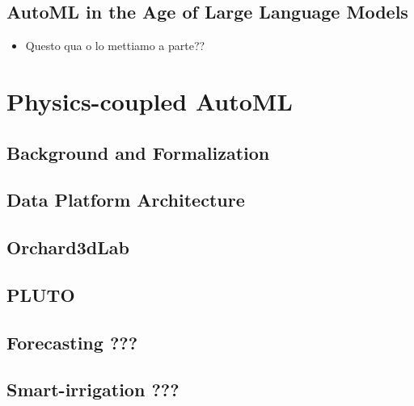 \documentclass[a4paper,12pt,times,numbered,print,index]{Classes/PhDThesisPSnPDF}
\begin{document}
\chapter{AutoML in the Age of Large Language Models}
\label{automl-chap:llm}
\begin{itemize}
    \item Questo qua o lo mettiamo a parte??
\end{itemize}

\part{Physics-coupled AutoML}\label{part:farming}

\chapter{Background and Formalization}
\label{precision-chap:background}

\chapter{Data Platform Architecture}
\label{precision-chap:architecture}

\chapter{Orchard3dLab}
\label{precision-chap:orchard}

\chapter{PLUTO}
\label{precision-chap:pluto}

\chapter{Forecasting ???}
\label{precision-chap:forecasting}

\chapter{Smart-irrigation ???}
\label{precision-chap:smart-irrigation}
\end{document}
